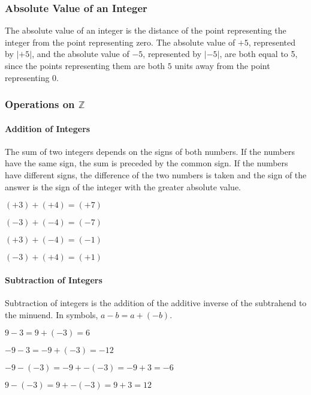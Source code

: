 \subsubsection*{Absolute Value of an Integer}
The absolute value of an integer is the distance of the point representing the integer from
the point representing zero. The absolute value of $+5$, represented by $|+5|$, and the absolute value
of $-5$, represented by $|-5|$, are both equal to 5, since the points representing them are both $5$
units away from the point representing 0.
\subsubsection*{Operations on $\mathbb Z$}
\paragraph*{Addition of Integers}
The sum of two integers depends on the signs of both numbers. If the numbers have the
same sign, the sum is preceded by the common sign. If the numbers have different signs, the
difference of the two numbers is taken and the sign of the answer is the sign of the integer with the
greater absolute value.
\begin{example}
\item 
	\begin{inparaenum}
	\item $(+3)+(+4)=(+7)$\hfil \item $(-3) + (-4) = (- 7)$
	\end{inparaenum}
\item 
	\begin{inparaenum}
	\item $(+3) + (-4) = (- 1)$\hfil \item $(-3) + (+4) = (+1)$
	\end{inparaenum}
\end{example}
\paragraph*{Subtraction of Integers}
Subtraction of integers is the addition of the additive inverse of the subtrahend to the
minuend. In symbols, $a - b = a + (-b)$.
\begin{example}
\item $9-3 = 9 + (-3) = 6$
\item $-9 - 3 = -9 + (-3) = -12$
\item $-9 - (-3) = -9 + -(-3) = -9 + 3 = -6$
\item $9 - (-3) = 9 + -(-3) = 9 + 3 = 12$
\end{example}
